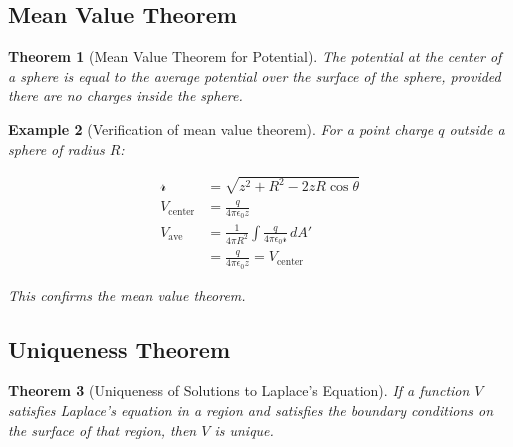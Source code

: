 \documentclass{article}
\newtheorem{theorem}{Theorem}[subsection]
\newtheorem{example}[theorem]{Example}
\begin{document}
\subsection{Mean Value Theorem}
\begin{theorem}[Mean Value Theorem for Potential]
The potential at the center of a sphere is equal to the average potential over the surface of the sphere, provided there are no charges inside the sphere.
\end{theorem}

\begin{example}[Verification of mean value theorem]
For a point charge $q$ outside a sphere of radius $R$:

\begin{center}
\end{center}

\begin{align*}
    \mathcal{r} &= \sqrt{z^2 + R^2 - 2zR\cos\theta} \\
    V_{\text{center}} &= \frac{q}{4\pi\epsilon_0 z} \\
    V_{\text{ave}} &= \frac{1}{4\pi R^2} \int \frac{q}{4\pi\epsilon_0 \mathcal{r}} \, dA' \\
    &= \frac{q}{4\pi\epsilon_0 z} = V_{\text{center}}
\end{align*}

This confirms the mean value theorem.
\end{example}

\subsection{Uniqueness Theorem}
\begin{theorem}[Uniqueness of Solutions to Laplace's Equation]
If a function $V$ satisfies Laplace's equation in a region and satisfies the boundary conditions on the surface of that region, then $V$ is unique.
\end{theorem}
\end{document}
